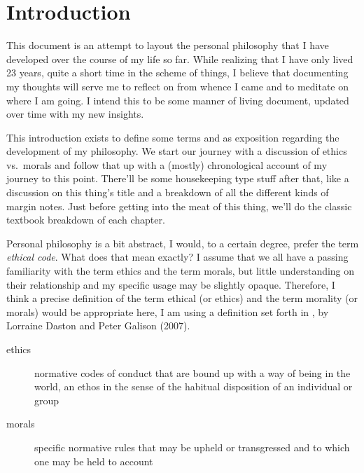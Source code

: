 \documentclass[./butidigress.tex]{subfiles}
\begin{document}
\chapter{Introduction}\label{chap:intro}
\newpage

\setcounter{footnote}{0}

This document is an attempt to layout the personal philosophy that I have developed over the course of my life so far.
While realizing that I have only lived 23 years, quite a short time in the scheme of things, I believe that documenting my thoughts will serve me to reflect on from whence I came and to meditate on where I am going.
I intend this to be some manner of living document, updated over time with my new insights.

This introduction exists to define some terms and as exposition regarding the development of my philosophy.
We start our journey with a discussion of ethics vs.\ morals and follow that up with a (mostly) chronological account of my journey to this point.
There'll be some housekeeping type stuff after that, like a discussion on this thing's title and a breakdown of all the different kinds of margin notes.
Just before getting into the meat of this thing, we'll do the classic textbook breakdown of each chapter.

\label{sec:ethics}
Personal philosophy is a bit abstract, I would, to a certain degree, prefer the term \emph{ethical code}.
What does that mean exactly?
I assume that we all have a passing familiarity with the term ethics and the term morals, but little understanding on their relationship and my specific usage may be slightly opaque.
Therefore, I think a precise definition of the term ethical (or ethics) and the term morality (or morals) would be appropriate here, I am using a definition set forth in , by Lorraine Daston and Peter Galison (2007).\autocite{objectivity}
\begin{description}
    \item [ethics] normative codes of conduct that are bound up with a way of being in the world, an ethos in the sense of the habitual disposition of an individual or group
    \item [morals] specific normative rules that may be upheld or transgressed and to which one may be held to account
\end{description}
\end{document}
